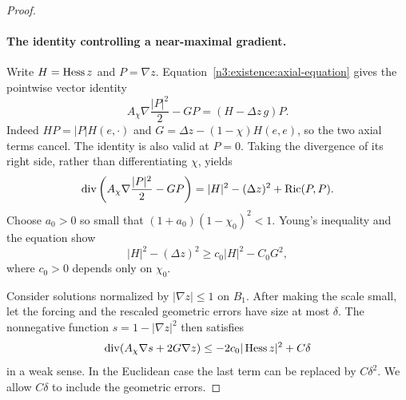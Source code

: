 \begin{proof}
\paragraph{The identity controlling a near-maximal gradient.}
Write $H=\operatorname{Hess} z$ and $P=\nabla z$.  Equation~\eqref{n3:existence:axial-equation}
gives the pointwise vector identity
\begin{equation}\label{n3:existence:gradient-flux}
 A_\chi\nabla\frac{|P|^2}{2}-GP
       =(H-\Delta z\,g)P.
\end{equation}
Indeed $HP=|P|H(e,\cdot)$ and
$G=\Delta z-(1-\chi)H(e,e)$, so the two axial terms cancel.
The identity is also valid at $P=0$.  Taking the divergence of its
right side, rather than differentiating $\chi$, yields
\begin{equation}\label{n3:existence:bochner-flux}
 \operatorname{div}\left(A_\chi\nabla\frac{|P|^2}{2}-GP\right)
 =|H|^2-(\Delta z)^2+\operatorname{Ric}(P,P).
\end{equation}
Choose $a_0>0$ so small that
$(1+a_0)(1-\chi_0)^2<1$.  Young's inequality and the equation show
\begin{equation}\label{n3:existence:positive-hessian}
 |H|^2-(\Delta z)^2
 \ge c_0|H|^2-C_0G^2,
\end{equation}
where $c_0>0$ depends only on $\chi_0$.

Consider solutions normalized by $|\nabla z|\le1$ on $B_1$.
After making the scale small, let the forcing and the rescaled
geometric errors have size at most $\delta$.  The nonnegative function
$s=1-|\nabla z|^2$ then satisfies
\begin{equation}\label{n3:existence:s-supersolution}
 \operatorname{div}(A_\chi\nabla s+2G\nabla z)
 \le -2c_0|\operatorname{Hess} z|^2+C\delta
\end{equation}
in a weak sense.  In the Euclidean case the last term can be replaced
by $C\delta^2$.  We allow $C\delta$ to include the geometric errors.


\end{proof}
